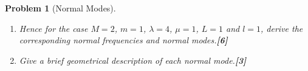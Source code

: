 \documentclass[a4paper]{article}
\theoremstyle{new}
\newtheorem{qns}{Problem}[section]
\begin{document}
\begin{qns}[Normal Modes]
\begin{enumerate}[label=(\roman*)]
$$\mathbf{T}=\begin{pmatrix}M&0&0\\0&m&0\\0&0&m\\\end{pmatrix}, \quad\mathbf{V}=\begin{pmatrix}\frac{\lambda}{L}+\frac{2\mu}{l}&-\frac{\mu}{l}&-\frac{\mu}{l}\\-\frac{\mu}{l}&\frac{\mu}{l}&0\\-\frac{-\mu}{l}&0&\frac{\mu}{l}\\\end{pmatrix}$$
and hence construct the Lagrangian for this system.\hfill\textbf{[6]}
\item Hence for the case $M = 2$, $m = 1$, $\lambda= 4$, $\mu=1$, $L = 1$ and $l = 1$, derive the corresponding normal frequencies and normal modes.\hfill\textbf{[6]}
\item Give a brief geometrical description of each normal mode.\hfill\textbf{[3]}
\end{enumerate}
\end{qns}
\newpage
\end{document}
